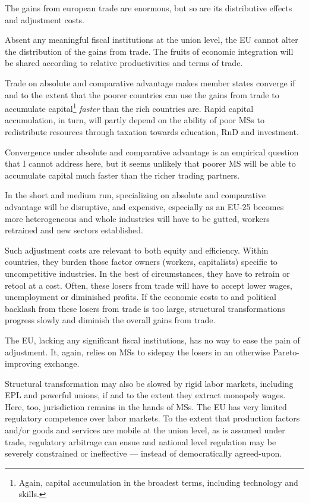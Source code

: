 \documentclass[11pt,a4paper,oneside,openright]{article}
\begin{document}
The gains from european trade are enormous, but so are its distributive effects and adjustment costs. 

Absent any meaningful fiscal institutions at the union level, the \gls{EU} cannot alter the distribution of the gains from trade. The fruits of economic integration will be shared according to relative productivities and terms of trade.

Trade on absolute and comparative advantage makes member states converge if and to the extent that the poorer countries can use the gains from trade to accumulate capital\footnote{
	Again, capital accumulation in the broadest terms, including technology and skills.}
\emph{faster} than the rich countries are. Rapid capital accumulation, in turn, will partly depend on the ability of poor \glspl{MS} to redistribute resources through taxation towards education, \gls{RnD} and investment.

Convergence under absolute and comparative advantage is an empirical question that I cannot address here, but it seems unlikely that poorer \gls{MS} will be able to accumulate capital much faster than the richer trading partners. 

In the short and medium run, specializing on absolute and comparative advantage will be disruptive, and expensive, especially as an \gls{EU}-25 becomes more heterogeneous and whole industries will have to be gutted, workers retrained and new sectors established. 

Such adjustment costs are relevant to both equity and efficiency. Within countries, they burden those factor owners (workers, capitalists) specific to uncompetitive industries. In the best of circumstances, they have to retrain or retool at a cost. Often, these losers from trade will have to accept lower wages, unemployment or diminished profits. If the economic costs to and political backlash from these losers from trade is too large, structural transformations progress slowly and diminish the overall gains from trade.

The \gls{EU}, lacking any significant fiscal institutions, has no way to ease the pain of adjustment. It, again, relies on \glspl{MS} to sidepay the losers in an otherwise Pareto-improving exchange. %

Structural transformation may also be slowed by rigid labor markets, including \gls{EPL} and powerful unions, if and to the extent they extract monopoly wages. Here, too, jurisdiction remains in the hands of \glspl{MS}. The \gls{EU} has very limited regulatory competence over labor markets. To the extent that production factors and/or goods and services are mobile at the union level, as is assumed under trade, regulatory arbitrage can ensue and national level regulation may be severely constrained or ineffective --- instead of democratically agreed-upon.
\end{document}
